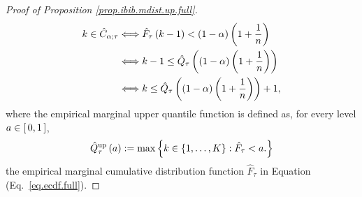 \documentclass[11pt]{article}
\begin{document}
\begin{proof}[Proof of Proposition \ref{prop.ibib.mdist.up.full}]
\begin{align*}
    k \in \hat{C}_{\alpha; \tau}
    &
    \Longleftrightarrow
    \hat{F}_{\tau} \left( k-1 \right)
    <
    \left( 1 - \alpha \right) \left( 1 + \frac{1}{n} \right)
    \\
    &
    \Longleftrightarrow
    k-1
    \leq
    \hat{Q}_{\tau} \left( \left( 1 - \alpha \right) \left( 1 + \frac{1}{n} \right) \right)
    \\
    &
    \Longleftrightarrow
    k
    \leq
    \hat{Q}_{\tau} \left( \left( 1 - \alpha \right) \left( 1 + \frac{1}{n} \right) \right) + 1,
\end{align*}
where the empirical marginal upper quantile function is defined as, for every level $a \in \left[\, 0, 1 \,\right]$,
\begin{align}
    \label{eq.eqt.up.full}
    \hat{Q}_{\tau}^{\mathrm{up}} \left( a \right)
    := \max \left\{ 
        k \in \left\{ 1, \ldots, K \right\} :
        \hat{F}_{\tau} < a.
     \right\}
\end{align}
the empirical marginal cumulative distribution function $\hat{F}_{\tau}$ in Equation (Eq.~\eqref{eq.ecdf.full}).
\end{proof}
\end{document}
